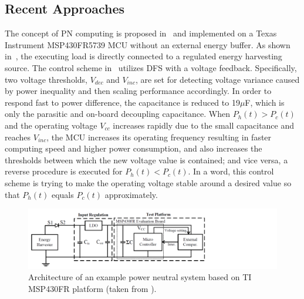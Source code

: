 \subsection{Recent Approaches}

The concept of PN computing is proposed in~\cite{balsamo2016graceful} and implemented on a Texas Instrument MSP430FR5739 MCU without an external energy buffer. As shown in~, the executing load is directly connected to a regulated energy harvesting source. The control scheme in~\cite{balsamo2016graceful} utilizes DFS with a voltage feedback. Specifically, two voltage thresholds, $V_{dec}$ and $V_{inc}$, are set for detecting voltage variance caused by power inequality and then scaling performance accordingly. In order to respond fast to power difference, the capacitance is reduced to 19$\mu$F, which is only the parasitic and on-board decoupling capacitance. When $P_h(t) > P_c(t)$ and the operating voltage $V_{cc}$ increases rapidly due to the small capacitance and reaches $V_{inc}$, the MCU increases its operating frequency resulting in faster computing speed and higher power consumption, and also increases the thresholds between which the new voltage value is contained; and vice versa, a reverse procedure is executed for $P_h(t) < P_c(t)$. In a word, this control scheme is trying to make the operating voltage stable around a desired value so that $P_h(t)$  equals $P_c(t)$ approximately.

\begin{figure}[!htb]
    \centering
    \includegraphics[width=14cm]{ch2_review/figures/graceful_schematic}
    \caption{Architecture of an example power neutral system based on TI MSP430FR platform (taken from \cite{balsamo2016graceful}).}
    \label{Figure:graceful_schematic}
\end{figure}

